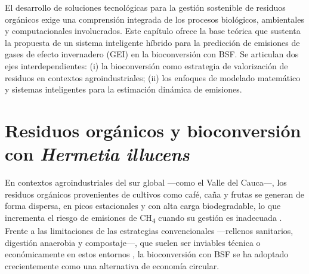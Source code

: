 El desarrollo de soluciones tecnológicas para la gestión sostenible de residuos orgánicos exige una comprensión integrada de los procesos biológicos, ambientales y computacionales involucrados. Este capítulo ofrece la base teórica que sustenta la propuesta de un sistema inteligente híbrido para la predicción de emisiones de gases de efecto invernadero (GEI) en la bioconversión con BSF. Se articulan dos ejes interdependientes: (i) la bioconversión como estrategia de valorización de residuos en contextos agroindustriales; (ii) los enfoques de modelado matemático y sistemas inteligentes para la estimación dinámica de emisiones.

\section{Residuos orgánicos y bioconversión con \textit{Hermetia illucens}}

En contextos agroindustriales del sur global —como el Valle del Cauca—, los residuos orgánicos provenientes de cultivos como café, caña y frutas se generan de forma dispersa, en picos estacionales y con alta carga biodegradable, lo que incrementa el riesgo de emisiones de CH\textsubscript{4} cuando su gestión es inadecuada \parencite{FAO2021,Leddin2024}. Frente a las limitaciones de las estrategias convencionales —rellenos sanitarios, digestión anaerobia y compostaje—, que suelen ser inviables técnica o económicamente en estos entornos \parencite{kongEvaluatingGreenhouseGas2012,nordahlGreenhouseGasAir2023}, la bioconversión con BSF se ha adoptado crecientemente como una alternativa de economía circular.

